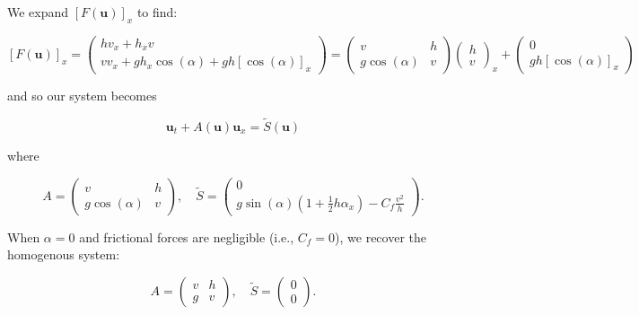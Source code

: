 We expand $[F(\textbf{u})]_x$ to find:

$$
[F(\textbf{u})]_x = \begin{pmatrix}
    h v_x + h_x v \\
    v v_x + g h_x \cos{(\alpha)} + g h [\cos{(\alpha)}]_x
\end{pmatrix} = \begin{pmatrix}
    v                & h \\
    g \cos{(\alpha)} & v
\end{pmatrix} \begin{pmatrix}
    h \\
    v
\end{pmatrix}_x + \begin{pmatrix}
    0 \\
    g h [\cos{(\alpha)}]_x
\end{pmatrix}
$$

and so our system becomes

$$
\textbf{u}_t + A(\textbf{u}) \textbf{u}_x = \tilde{S}(\textbf{u})
$$

where 

$$
A = \begin{pmatrix}
    v                & h \\
    g \cos{(\alpha)} & v
\end{pmatrix}, \quad \tilde{S} = \begin{pmatrix}
    0 \\
    g \sin{(\alpha)} \left(1 + \frac{1}{2} h \alpha_x \right) - C_f \frac{v^2}{h}
\end{pmatrix}.
$$

When $\alpha = 0$ and frictional forces are negligible (i.e., $C_f = 0$), we recover the homogenous system:

$$
A = \begin{pmatrix}
    v  & h \\
    g  & v
\end{pmatrix}, \quad \tilde{S} = \begin{pmatrix}
    0 \\
    0
\end{pmatrix}.
$$
